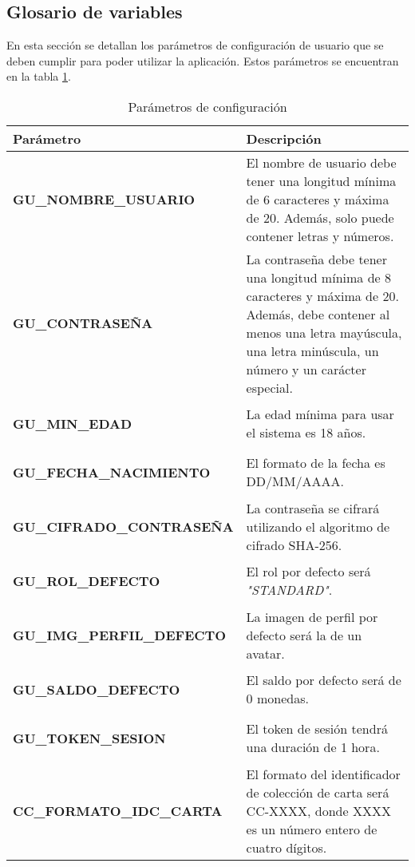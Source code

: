 \subsection{Glosario de variables}\hypertarget{anexo:glosario_variables}{}
En esta sección se detallan los parámetros de configuración de usuario que se deben cumplir para poder utilizar la aplicación. Estos parámetros se encuentran en la tabla \ref{table:variables_requisitos}.
\begin{table}[htb]
    \centering
    \caption{Parámetros de configuración}
    \label{table:variables_requisitos}
    \begin{tabular}{>{\columncolor{lightgreen!20}}p{7cm} p{10cm}}
    \toprule
    \rowcolor{darkgreen!50}
    \textbf{Parámetro} & \textbf{Descripción} \\
    \midrule
    \hypertarget{confParam:gu-nombreUsuario}{}
    \textbf{GU\_NOMBRE\_USUARIO} & El nombre de usuario debe tener una longitud mínima de 6 caracteres y máxima de 20. Además, solo puede contener letras y números.  \\
    \midrule
    \hypertarget{confParam:gu-contrasena}{}
    \textbf{GU\_CONTRASEÑA} & La contraseña debe tener una longitud mínima de 8 caracteres y máxima de 20. Además, debe contener al menos una letra mayúscula, una letra minúscula, un número y un carácter especial. \\
    \midrule
    \hypertarget{confParam:gu-minEdad}{}
    \textbf{GU\_MIN\_EDAD} & La edad mínima para usar el sistema es 18 años. \\
    \midrule
    \hypertarget{confParam:gu-fechaNacimiento}{}
    \textbf{GU\_FECHA\_NACIMIENTO} & El formato  de la fecha es DD/MM/AAAA. \\
    \midrule
    \hypertarget{confParam:gu-cifradoContrasena}{}
    \textbf{GU\_CIFRADO\_CONTRASEÑA} & La contraseña se cifrará utilizando el algoritmo de cifrado SHA-256.  \\
    \midrule
    \hypertarget{confParam:gu-rolDefecto}{}
    \textbf{GU\_ROL\_DEFECTO} & El rol por defecto será \textit{"STANDARD"}. \\
    \midrule
    \hypertarget{confParam:gu-imgPerfilDefecto}{}
    \textbf{GU\_IMG\_PERFIL\_DEFECTO} & La imagen de perfil por defecto será la de un avatar.  \\
    \midrule
    \hypertarget{confParam:gu-saldoDefecto}{}
    \textbf{GU\_SALDO\_DEFECTO} & El saldo por defecto será de 0 monedas. \\
    \midrule
    \hypertarget{confParam:gu-tokenSesion}{}
    \textbf{GU\_TOKEN\_SESION} & El token de sesión tendrá una duración de 1 hora. \\
    \midrule
    \hypertarget{confParam:cc-formatoIDCCarta}{}
    \textbf{CC\_FORMATO\_IDC\_CARTA} & El formato del identificador de colección de carta será CC-XXXX, donde XXXX es un número entero de cuatro dígitos. \\
    \bottomrule
    \end{tabular}
\end{table}